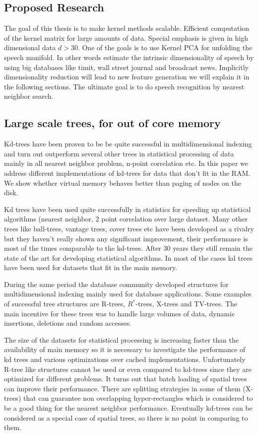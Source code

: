 \documentclass[12pt,letterpaper,doublespaced,ETD,dvips,proposal]{gtthesis}
\begin{document}
\begin{Body}
\section{Proposed Research}
\label{proposed}

The goal of this thesis is to make kernel methods scalable.
Efficient computation of the kernel matrix for large amounts of
data. Special emphasis is given in high dimensional data $d>30$. One
of the goals is to use Kernel PCA for unfolding the speech manifold.
In other words estimate the intrinsic dimensionality of speech by
using big databases like timit, wall street journal and broadcast
news. Implicitly dimensionality reduction will lead to new feature
generation we will explain it in the following sections. The
ultimate goal is to do speech recognition by nearest neighbor
search.
\subsection{Large scale trees, for out of core memory}
Kd-trees have been proven to be be quite successful in
multidimensional indexing and turn out outperform several other
trees in statistical processing of data mainly in all nearest
neighbor problem, n-point correlation etc. In this paper we address
different implementations of kd-trees for data that don't fit in the
RAM. We show whether virtual memory behaves better   than paging of
nodes on the disk.

Kd trees have been used quite successfully in statistics for
speeding up statistical algorithms (nearest neighbor, 2 point
correlation  over large dataset. Many other trees like ball-trees,
vantage trees, cover trees etc have been developed as a rivalry but
they haven't really shown any significant improvement, their
performance is most of the times comparable to the kd-trees. After
30 years they still remain the state of the art for developing
statistical algorithms. In most of the cases kd trees have been used
for datasets that fit in the main memory.

During the same period the database community developed structures
for multidimensional indexing mainly used for database applications.
Some examples of successful tree structures are R-trees,
$R^{*}$-trees, X-trees and TV-trees. The main incentive for these
trees was to handle large volumes of data, dynamic insertions,
deletions and random accesses.

The size of the datasets for statistical processing is increasing
faster than the availability of  main memory so it is necessary to
investigate the performance of kd trees and various optimizations
over cached implementations. Unfortunately R-tree like structures
cannot be used or even compared to kd-trees since they are optimized
for different problems. It turns out that batch loading of spatial
trees can improve their performance. There are splitting strategies
in some of them (X-trees) that can guarantee non overlapping
hyper-rectangles which is considered to be a good thing for the
nearest neighbor performance. Eventually kd-trees can be considered
as a special case of spatial trees, so there is no point in
comparing to them.


\end{Body}
\end{document}
